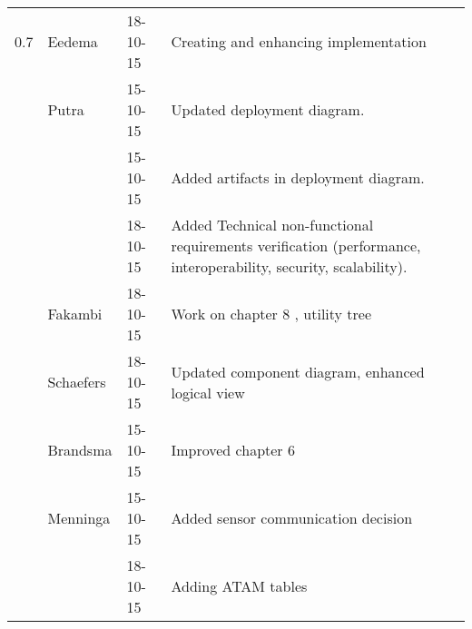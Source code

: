 \begin{longtable}{L{} L{} L{} L{}}
	0.7              & Eedema				 & 18-10-15		& Creating and enhancing implementation \\
					 & Putra				 & 15-10-15      & Updated deployment diagram. \\
	                 &                       & 15-10-15      & Added artifacts in deployment diagram. \\
	                 &      	             & 18-10-15      & Added Technical non-functional requirements verification (performance, interoperability, security, scalability). \\
	                 & Fakambi               & 18-10-15      & Work on chapter 8 , utility tree \\
	                 & Schaefers			 & 18-10-15      & Updated component diagram, enhanced logical view \\
                     & Brandsma				 & 15-10-15		 & Improved chapter 6 \\
                     & Menninga				 & 15-10-15      & Added sensor communication decision \\
	                 & 						 & 18-10-15      & Adding ATAM tables \\


\end{longtable}

